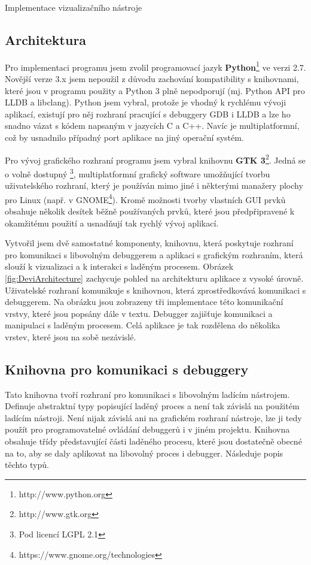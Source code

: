 \documentclass[czech,bachelor,male,python,dept460]{diploma}						%
\newcommand{\parspace}[1][]{
	\ifthenelse{\isempty{#1}}{\vspace{5mm}}{\vspace{#1}}
	\par
}
\begin{document}
\begin{section}{Implementace vizualizačního nástroje}
	\subsection{Architektura}
	\par Pro implementaci programu jsem zvolil programovací jazyk \textbf{Python}\footnote{http://www.python.org} ve verzi 2.7. Novější verze 3.x jsem nepoužil
	z důvodu zachování kompatibility s knihovnami, které jsou v programu použity a Python 3 plně nepodporují (mj. Python API pro LLDB a libclang).
	Python jsem vybral, protože je vhodný k rychlému vývoji aplikací, existují pro něj rozhraní pracující s debuggery GDB i LLDB a lze ho snadno vázat
	s kódem napsaným v jazycích C a C++. Navíc je multiplatformní, což by usnadnilo případný port aplikace na jiný operační systém.
	
	\parspace Pro vývoj grafického rozhraní programu jsem vybral knihovnu \textbf{GTK 3}\footnote{http://www.gtk.org}. Jedná se o volně dostupný
	\footnote{Pod licencí LGPL 2.1}, multiplatformní grafický software umožňující tvorbu uživatelského rozhraní, který je používán mimo jiné i
	některými manažery plochy pro Linux (např. v GNOME\footnote{https://www.gnome.org/technologies}). Kromě možnosti tvorby vlastních
	GUI prvků obsahuje několik desítek běžně používaných prvků, které jsou předpřipravené k okamžitému použití a usnadňují tak rychlý vývoj aplikací.
	
	\parspace Vytvořil jsem dvě samostatné komponenty, knihovnu, která poskytuje rozhraní pro komunikaci s libovolným debuggerem a aplikaci s grafickým rozhraním,
	která slouží k vizualizaci a k interakci s laděným procesem.
	Obrázek \ref{fig:DeviArchitecture} zachycuje pohled na architekturu aplikace z vysoké úrovně.
	Uživatelské rozhraní komunikuje s knihovnou, která zprostředkovává komunikaci s debuggerem. Na obrázku jsou zobrazeny tři implementace této komunikační vrstvy,
	které jsou popsány dále v textu. Debugger zajišťuje komunikaci a manipulaci s laděným procesem. Celá aplikace je tak rozdělena do několika
	vrstev, které jsou na sobě nezávislé.
	
		
	\subsection{Knihovna pro komunikaci s debuggery}
	\label{sec:DebuggerApi}
		Tato knihovna tvoří rozhraní pro komunikaci s libovolným ladícím nástrojem. Definuje abstraktní typy popisující laděný proces a není tak závislá na
		použitém ladícím nástroji. Není nijak závislá ani na grafickém rozhraní nástroje, lze ji tedy použít pro programovatelné ovládání debuggerů i v jiném
		projektu. Knihovna obsahuje třídy představující části laděného procesu, které jsou dostatečně obecné na to, aby se daly aplikovat na libovolný
		proces i debugger. Následuje popis těchto typů.
		

\end{section}
\end{document}
